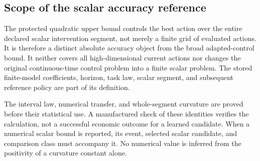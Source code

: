 \subsection{Scope of the scalar accuracy reference}
The protected quadratic upper bound controls the best action over the entire declared scalar intervention segment, not merely a finite grid of evaluated actions. It is therefore a distinct absolute accuracy object from the broad adapted-control bound. It neither covers all high-dimensional current actions nor changes the original continuous-time control problem into a finite scalar problem. The stored finite-model coefficients, horizon, task law, scalar segment, and subsequent reference policy are part of its definition.

The interval law, numerical transfer, and whole-segment curvature are proved before their statistical use. A manufactured check of these identities verifies the calculation, not a successful economic outcome for a learned candidate. When a numerical scalar bound is reported, its event, selected scalar candidate, and comparison class must accompany it. No numerical value is inferred from the positivity of a curvature constant alone.
